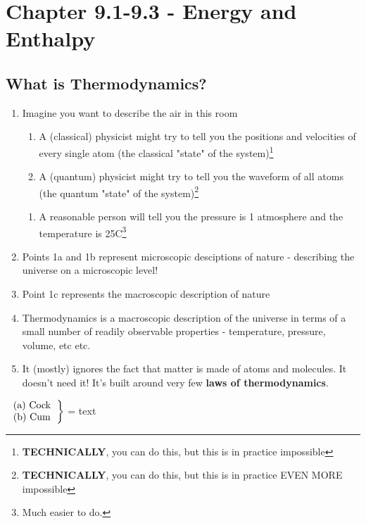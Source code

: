 \documentclass{article}  %
\begin{document}
\newpage

\section*{Chapter 9.1-9.3 - Energy and Enthalpy}

\subsection*{What is Thermodynamics?}
\begin{enumerate}
    \item Imagine you want to describe the air in this room
    \begin{enumerate}
        \item A (classical) physicist might try to tell you the positions and velocities of every single atom (the classical "state" of the system)\footnote{\textbf{TECHNICALLY}, you can do this, but this is in practice impossible}
        \item A (quantum) physicist might try to tell you the waveform of all atoms (the quantum "state" of the system)\footnote{\textbf{TECHNICALLY}, you can do this, but this is in practice EVEN MORE impossible}
    \end{enumerate}
    \begin{enumerate}
        \item A reasonable person will tell you the pressure is 1 atmosphere and the temperature is 25C\footnote{Much easier to do.}
    \end{enumerate}
    \item Points 1a and 1b represent microscopic desciptions of nature - describing the universe on a microscopic level!
    \item Point 1c represents the macroscopic description of nature
    \item Thermodynamics is a macroscopic description of the universe in terms of a small number of readily observable properties - temperature, pressure, volume, etc etc.
    \item It (mostly) ignores the fact that matter is made of atoms and molecules. It doesn't need it! It's built around very few \textbf{laws of thermodynamics}. 
\end{enumerate}
$\left.
    \begin{tabular}{ll}
        (a) Cock \\
        (b) Cum
    \end{tabular}
\right\}$  = text
    
\end{document}
